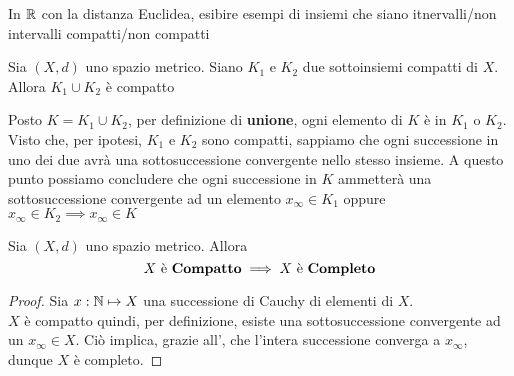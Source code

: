 \begin{exercise}
	In $\mathbb{R}$ con la distanza Euclidea, esibire esempi di insiemi che siano itnervalli/non intervalli compatti/non compatti
\end{exercise}
\begin{exercise}
	\label{ex:unione_compatti}
	Sia $(X,d)$ uno spazio metrico. Siano $K_1$ e $K_2$ due sottoinsiemi compatti di $X$. Allora $K_1 \cup K_2$ è compatto
	\begin{solution}
		Posto $K = K_1 \cup K_2$, per definizione di \textbf{unione}, ogni elemento di $K$ è in $K_1$ o $K_2$.\\
		Visto che, per ipotesi, $K_1$ e $K_2$ sono compatti, sappiamo che ogni successione in uno dei due avrà una sottosuccessione convergente nello stesso insieme. A questo punto possiamo concludere che ogni successione in $K$ ammetterà una sottosuccessione convergente ad un elemento $x_\infty \in K_1$ oppure $x_\infty \in K_2 \implies x_\infty \in K$
	\end{solution}
\end{exercise}

\begin{proposition}
	Sia $(X,d)$ uno spazio metrico. Allora
	$$X \text{ è \textbf{Compatto}} \implies X \text{ è \textbf{Completo}}$$
	\begin{proof}
		Sia $x: \mathbb{N} \mapsto X$ una successione di Cauchy di elementi di $X$.\\
		$X$ è compatto quindi, per definizione, esiste una sottosuccessione convergente ad un $x_\infty \in X$. Ciò implica, grazie all', che l'intera successione converga a $x_\infty$, dunque $X$ è completo.
	\end{proof}
\end{proposition}

